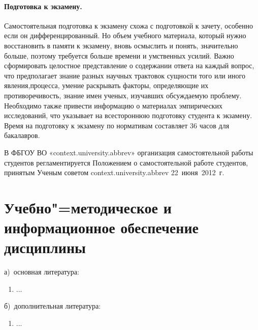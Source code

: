 \documentclass[12pt]{scrartcl}
\newcommand{\rdf}[2]{#2}
\newenvironment{rdfctx}[1]{}{}
\begin{document}
\paragraph{Подготовка к экзамену.} Самостоятельная подготовка к экзамену схожа с
подготовкой к зачету, особенно если он дифференцированный. Но объем учебного
материала, который нужно восстановить в памяти к экзамену, вновь осмыслить и понять,
значительно больше, поэтому требуется больше времени и умственных усилий. Важно
сформировать целостное представление о содержании ответа на каждый вопрос, что
предполагает знание разных научных трактовок сущности того или иного явления,процесса, умение раскрывать факторы, определяющие их противоречивость, знание имен
ученых, изучавших обсуждаемую проблему. Необходимо также привести информацию о
материалах эмпирических исследований, что указывает на всестороннюю подготовку
студента к экзамену. Время на подготовку к экзамену по нормативам составляет 36 часов
для бакалавров.

В ФБГОУ ВО «{{context.university.abbrev}}» организация самостоятельной работы студентов
регламентируется Положением о самостоятельной работе студентов, принятым Ученым
советом {{context.university.abbrev}} 22~июня~2012~г.

\section{Учебно"=методическое и информационное обеспечение дисциплины}
\noindent а)\ основная литература:
\begin{rdfctx}{\rdfsetctx{list}{syll wpdd:itemList !wpdd:BaseReferenceList !wpdd:ItemList}}
  \begin{enumerate}
      \item \rdf{list ^schema:member !wpdd:ListItem !wpdd:Reference}{...}
  \end{enumerate}
\end{rdfctx}

\noindent б)\ дополнительная литература:
\begin{rdfctx}{\rdfsetctx{list}{syll wpdd:itemList !wpdd:AuxReferenceList !wpdd:ItemList}}
  \begin{enumerate}
      \item \rdf{list ^schema:member !wpdd:ListItem !wpdd:Reference}{...}
  \end{enumerate}
\end{rdfctx}
\end{document}
